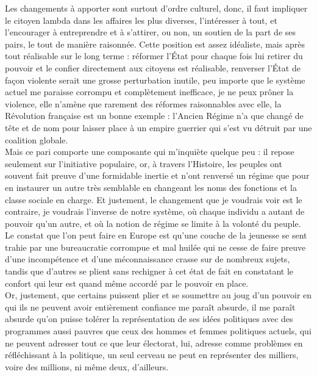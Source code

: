 \documentclass[12pt,a4paper]{article}
\begin{document}
{Les changements à apporter sont surtout d'ordre culturel, donc, il faut impliquer le citoyen lambda dans les affaires les plus diverses, l'intéresser à tout, et l'encourager à entreprendre et à s'attirer, ou non, un soutien de la part de ses pairs, le tout de manière raisonnée. Cette position est assez idéaliste, mais après tout réalisable sur le long terme : réformer l'État pour chaque fois lui retirer du pouvoir et le confier directement aux citoyens est réalisable, renverser l'État de façon violente serait une grosse perturbation inutile, peu importe que le système actuel me paraisse corrompu et complètement inefficace, je ne peux prôner la violence, elle n'amène que rarement des réformes raisonnables avec elle, la Révolution française est un bonne exemple : l’Ancien Régime n’a que changé de tête et de nom pour laisser place à un empire guerrier qui s’est vu détruit par une coalition globale.\\

Mais ce pari comporte une composante qui m'inquiète quelque peu : il repose seulement sur l'initiative populaire, or, à travers l'Histoire, les peuples ont souvent fait preuve d'une formidable inertie et n'ont renversé un régime que pour en instaurer un autre très semblable en changeant les noms des fonctions et la classe sociale en charge. Et justement, le changement que je voudrais voir est le contraire, je voudrais l'inverse de notre système, où chaque individu a autant de pouvoir qu'un autre, et où la notion de régime se limite à la volonté du peuple. Le constat que l'on peut faire en Europe est qu'une couche de la jeunesse se sent trahie par une bureaucratie corrompue et mal huilée qui ne cesse de faire preuve d'une incompétence et d'une méconnaissance crasse sur de nombreux sujets, tandis que d'autres se plient sans rechigner à cet état de fait en constatant le confort qui leur est quand même accordé par le pouvoir en place.\\

Or, justement, que certains puissent plier et se soumettre au joug d'un pouvoir en qui ils ne peuvent avoir entièrement confiance me paraît absurde, il me paraît absurde qu'on puisse tolérer la représentation de ses idées politiques avec des programmes aussi pauvres que ceux des hommes et femmes politiques actuels, qui ne peuvent adresser tout ce que leur électorat, lui, adresse comme problèmes en réfléchissant à la politique, un seul cerveau ne peut en représenter des milliers, voire des millions, ni même deux, d’ailleurs.\\

}
\end{document}
